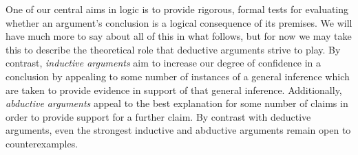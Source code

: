 \begin{earg}
\end{earg}

%
%

One of our central aims in logic is to provide rigorous, formal tests for evaluating whether an argument's conclusion is a logical consequence of its premises.
We will have much more to say about all of this in what follows, but for now we may take this to describe the theoretical role that deductive arguments strive to play.
By contrast, \textit{inductive arguments} aim to increase our degree of confidence in a conclusion by appealing to some number of instances of a general inference which are taken to provide evidence in support of that general inference.
Additionally, \textit{abductive arguments} appeal to the best explanation for some number of claims in order to provide support for a further claim. 
By contrast with deductive arguments, even the strongest inductive and abductive arguments remain open to counterexamples.

